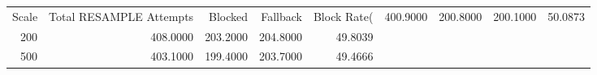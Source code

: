\begin{tabular}{rrrrr}
\toprule
Scale & Total RESAMPLE Attempts & Blocked & Fallback & Block Rate(%
 & 400.9000 & 200.8000 & 200.1000 & 50.0873 \\
200 & 408.0000 & 203.2000 & 204.8000 & 49.8039 \\
500 & 403.1000 & 199.4000 & 203.7000 & 49.4666 \\
\bottomrule
\end{tabular}
